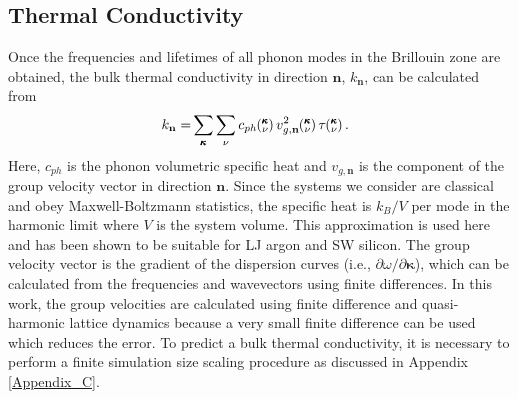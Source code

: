 \documentclass[letterpaper,12pt]{article}
\newcommand{\kv}{\mspace{-4.0mu}\left(\mspace{-8.0mu}\begin{smallmatrix}&\pmb{\kappa} \\&\nu\end{smallmatrix}\mspace{-3.0mu}\right)}
\begin{document}
%

\subsection{\label{Subsection_Comp_Details_3}Thermal Conductivity}

Once the frequencies and lifetimes of all phonon modes in the
Brillouin zone are obtained, the bulk thermal conductivity in direction
$\mathbf{n}$, $k_{\mathbf{n}}$, can be calculated from \cite{ziman2001}
\begin{equation}\label{E-size:k_bulk}\
\begin{split}
k_{\mathbf{n}}=&\sum_{\pmb{\kappa}} \sum_\nu c_{ph} \kv v^{2}_{g,\mathbf{n}} \kv \tau \kv.
\end{split}
\end{equation}
Here, $c_{ph}$ is the phonon volumetric specific heat and ${v}_{g,\mathbf{n}}$ is
the component of the group velocity vector in direction $\mathbf{n}$. Since the systems we consider are classical and obey Maxwell-Boltzmann statistics,\cite{mcquarrie2000} the
specific heat is $k_{B}/V$ per mode in the harmonic limit where $V$ is the system volume. This approximation is used here and has been shown to be suitable for LJ argon\cite{mcgaughey2004c} and SW silicon.\cite{goicochea2010} The group
velocity vector is the gradient of the dispersion curves (i.e., $\partial \omega / \partial \pmb{\kappa}$), which can be calculated from the frequencies and wavevectors using finite differences. In this work, the group velocities are calculated using finite difference and quasi-harmonic lattice dynamics because a very small finite difference can be used which reduces the error.\cite{mcgaughey2006b} To predict a bulk thermal conductivity, it is necessary to perform a finite simulation size scaling procedure as discussed in Appendix \ref{Appendix_C}.
\end{document}

